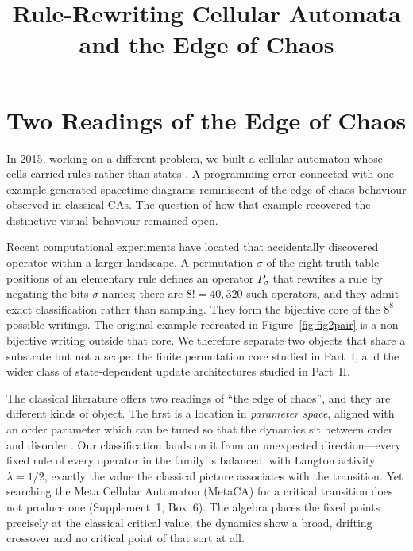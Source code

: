 \documentclass[man,12pt,floatsintext,donotrepeattitle]{apa7}
\title{Rule-Rewriting Cellular Automata and the Edge of Chaos}
\newcommand{\sig}{\sigma}
\newcommand{\suppfindingref}[1]{Supplement~1, Box~#1}
\begin{document}
\maketitle

\section{Two Readings of the Edge of Chaos}
\label{sec:intro}

In 2015, working on a different problem, we built a cellular automaton
whose cells carried rules rather than states
\parencite{corneli2015search}.  A programming error connected with one
example generated spacetime diagrams reminiscent of the edge of chaos
behaviour observed in classical CAs.  The question of how that example
recovered the distinctive visual behaviour remained open.

Recent computational experiments have located that accidentally discovered
operator within a larger landscape. A permutation $\sig$ of the eight
truth-table positions of an elementary rule defines an operator $P_\sig$ that
rewrites a rule by negating the bits $\sig$ names; there are $8! = 40{,}320$
such operators, and they admit exact classification rather than sampling. They
form the bijective core of the $8^8$ possible writings. The original example
recreated in Figure~\ref{fig:fig2pair} is a non-bijective writing outside that
core. We therefore separate two objects that share a substrate but not a scope:
the finite permutation core studied in Part~I, and the wider class of
state-dependent update architectures studied in Part~II.

The classical literature offers two readings of ``the edge of chaos'', and they
are different kinds of object. The first is a location in \emph{parameter
space},
aligned with an order parameter which can be tuned so that the dynamics sit
between order and disorder \parencite{langton1990computation}. Our
classification lands on it from an unexpected direction---every fixed rule of
every operator in the family is balanced, with Langton activity
$\lambda = 1/2$, exactly the value the classical picture associates with the
transition. Yet searching the Meta Cellular Automaton (MetaCA) for a critical
transition does not produce one (\suppfindingref{6}). The
algebra places the fixed points precisely at the classical critical value; the
dynamics show a broad, drifting crossover and no critical point of that sort at
all.
\end{document}
